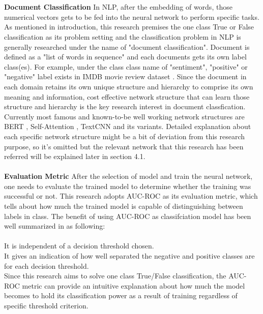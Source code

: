 \documentclass[sigconf]{acmart}
\begin{document}
\\\\
\textbf{Document Classification} In NLP, after the embedding of words, those numerical vectors gets to be fed into the neural network to perform specific tasks. As mentioned in introduction, this research premises the one class True or False classification as its problem setting and the classification problem in NLP is generally researched under the name of "document classification". 
Document is defined as a "list of words in sequence" and each documents gets its own label class(es). For example, under the class class name of "sentiment", "positive" or "negative" label exists in IMDB movie review dataset \cite{maas-EtAl:2011:ACL-HLT2011}. Since the document in each domain retains its own unique structure and hierarchy to comprise its own meaning and information, cost effective network structure that can learn those structure and hierarchy is the key research interest in document classfication. Currently most famous and known-to-be well working network structures are BERT \cite{DBLP:journals/corr/abs-1810-04805}, Self-Attention \cite{DBLP:journals/corr/VaswaniSPUJGKP17}, TextCNN \cite{DBLP:journals/corr/Kim14f} and its variants. Detailed explanation about each specific network structure might be a bit of deviation from this research purpose, so it's omitted but the relevant network that this research has been referred will be explained later in section 4.1.
\\\\
\textbf{Evaluation Metric} After the selection of model and train the neural network, one needs to evaluate the trained model to determine whether the training was successful or not. This research adopts AUC-ROC\cite{Bradely1997} as its evaluation metric, which tells about how much the trained model is capable of distinguishing between labels in class. The benefit of using AUC-ROC as classifciation model has been well summarized in \cite{Bradely1997} as following:\\\\\indent \textbullet \hspace{1mm}  It is independent of a decision threshold chosen.\\\indent \textbullet \hspace{1mm}  It gives an indication of how well separated the
negative and positive classes are for each decision threshold.\\

Since this research aims to solve one class True/False classification, the AUC-ROC metric can provide an intuitive explanation about how much the model becomes to hold its classification power as a result of training regardless of specific threshold criterion.\\
\end{document}
